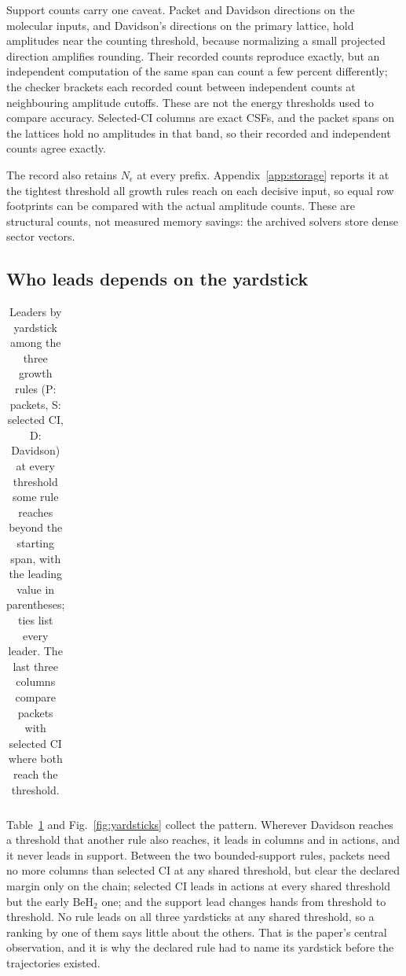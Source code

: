 \documentclass[aps,pra,reprint,superscriptaddress,nofootinbib,floatfix,
  showkeys,raggedbottom]{revtex4-2}
\begin{document}
Support counts carry one caveat. Packet and Davidson directions on the
molecular inputs, and Davidson's directions on the primary lattice, hold
amplitudes near the \pkSupportTolerance{} counting threshold, because
normalizing a small projected direction amplifies rounding. Their recorded
counts reproduce exactly, but an independent computation of the same span can
count a few percent differently; the checker brackets each recorded count
between independent counts at neighbouring amplitude cutoffs. These are not
the energy thresholds used to compare accuracy. Selected-CI columns
are exact CSFs, and the packet spans on the lattices hold no amplitudes in that
band, so their recorded and independent counts agree exactly.

The record also retains $N_\epsilon$ at every prefix.
Appendix~\ref{app:storage} reports it at the tightest threshold all growth
rules reach on each decisive input, so equal row footprints can be compared
with the actual amplitude counts. These are structural counts, not measured
memory savings: the archived solvers store dense sector vectors.

\subsection{Who leads depends on the yardstick}

\begin{table}[t]
\caption{Leaders by yardstick among the three growth rules (P: packets, S:
selected CI, D: Davidson) at every threshold some rule reaches beyond the
starting span, with the leading value in parentheses; ties list every leader.
The last three columns compare packets with selected CI where both reach the
threshold.}
\label{tab:leaders}
\begin{ruledtabular}
\begin{tabular}{llllllll}

\end{tabular}
\end{ruledtabular}
\end{table}


Table~\ref{tab:leaders} and Fig.~\ref{fig:yardsticks} collect the pattern.
Wherever Davidson reaches a threshold that another rule also reaches, it leads
in columns and in actions, and it never leads in support. Between the two
bounded-support rules, packets need no more columns than selected CI at any
shared threshold, but clear the declared margin only on the chain; selected CI
leads in actions at every shared threshold but the early BeH$_2$ one; and the
support lead changes hands from threshold to threshold. No rule leads on all three yardsticks at any shared threshold, so
a ranking by one of them says little about the others. That is the paper's
central observation, and it is why the declared rule had to name its yardstick
before the trajectories existed.
\end{document}
